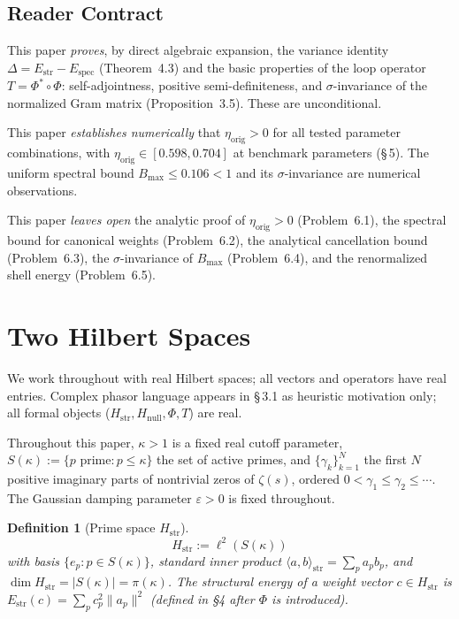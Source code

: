 \documentclass[11pt]{article}
\newtheorem{definition}[theorem]{Definition}
\newcommand{\Hstr}{H_{\mathrm{str}}}
\newcommand{\Hnull}{H_{\mathrm{null}}}
\newcommand{\Estr}{E_{\mathrm{str}}}
\newcommand{\Espec}{E_{\mathrm{spec}}}
\newcommand{\etaorig}{\eta_{\mathrm{orig}}}
\begin{document}
\subsection{Reader Contract}

This paper \emph{proves}, by direct algebraic expansion, the
variance identity $\Delta=\Estr-\Espec$ (Theorem~4.3) and the basic
properties of the loop operator $T=\Phi^*\circ\Phi$: self-adjointness,
positive semi-definiteness, and $\sigma$-invariance of the normalized
Gram matrix (Proposition~3.5). These are unconditional.

This paper \emph{establishes numerically} that $\etaorig>0$ for all
tested parameter combinations, with
$\etaorig\in[0.598,0.704]$ at benchmark parameters (\S\,5).
The uniform spectral bound $B_{\max}\le 0.106<1$ and its
$\sigma$-invariance are numerical observations.

This paper \emph{leaves open} the analytic proof of $\etaorig>0$
(Problem~6.1), the spectral bound for canonical weights
(Problem~6.2), the analytical cancellation bound (Problem~6.3),
the $\sigma$-invariance of $B_{\max}$ (Problem~6.4), and the
renormalized shell energy (Problem~6.5).

\section{Two Hilbert Spaces}

We work throughout with real Hilbert spaces; all vectors and operators have
real entries. Complex phasor language appears in \S\,3.1 as
heuristic motivation only; all formal objects ($\Hstr, \Hnull, \Phi, T$)
are real.

Throughout this paper, $\kappa>1$ is a fixed real cutoff parameter,
$S(\kappa):=\{p\text{ prime}:p\leq\kappa\}$ the set of active primes,
and $\{\gamma_k\}_{k=1}^N$ the first $N$ positive imaginary parts of
nontrivial zeros of $\zeta(s)$, ordered $0<\gamma_1\leq\gamma_2\leq\cdots$.
The Gaussian damping parameter $\varepsilon>0$ is fixed throughout.

\begin{definition}[Prime space $\Hstr$]
\[
\Hstr := \ell^2(S(\kappa))
\]
with basis $\{e_p : p\in S(\kappa)\}$, standard inner product
$\langle a,b\rangle_{\mathrm{str}}=\sum_p a_p b_p$, and
$\dim\Hstr=|S(\kappa)|=\pi(\kappa)$.
The \emph{structural energy} of a weight vector $c\in\Hstr$ is
$\Estr(c)=\sum_p c_p^2\|a_p\|^2$ (defined in \S4 after $\Phi$ is introduced).
\end{definition}
\end{document}
